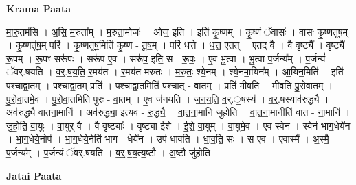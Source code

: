 \documentclass[17pt]{extarticle}
\begin{document}
\textbf{Krama Paata} \newline

मा॒रु॒तम॑सि । अ॒सि॒ म॒रुता᳚म् । म॒रुता॒मोजः॑ । ओज॒ इति॑ । इति॑ कृ॒ष्णम् । कृ॒ष्णं ॅवासः॑ । वासः॑ कृ॒ष्णतू॑षम् । कृ॒ष्णतू॑ष॒म् परि॑ । कृ॒ष्णतू॑ष॒मिति॑ कृ॒ष्ण - तू॒ष॒म् । परि॑ धत्ते । ध॒त्त॒ ए॒तत् । ए॒तद् वै । वै वृष्ट्यै᳚ । वृष्ट्यै॑ रू॒पम् । रू॒पꣳ सरू॑पः । सरू॑प ए॒व । सरू॑प॒ इति॒ स - रू॒पः॒ । ए॒व भू॒त्वा । भू॒त्वा प॒र्जन्य᳚म् । प॒र्जन्यं॑ ॅवर्.षयति । व॒र्॒.ष॒य॒ति॒ र॒मय॑त । र॒मय॑त मरुतः । म॒रु॒तः॒ श्ये॒नम् । श्ये॒नमा॒यिन᳚म् । आ॒यिन॒मिति॑ । इति॑ पश्चाद्वा॒तम् । प॒श्चा॒द्वा॒तम् प्रति॑ । प॒श्चा॒द्वा॒तमिति॑ पश्चात् - वा॒तम् । प्रति॑ मीवति । मी॒व॒ति॒ पु॒रो॒वा॒तम् । पु॒रो॒वा॒तमे॒व । पु॒रो॒वा॒तमिति॑ पुरः - वा॒तम् । ए॒व ज॑नयति । ज॒न॒य॒ति॒ व॒र्.॒षस्य॑ । व॒र्॒.षस्याव॑रुद्ध्यै । अव॑रुद्ध्यै वातना॒मानि॑ । अव॑रुद्ध्या॒ इत्यव॑ - रु॒द्ध्यै॒ । वा॒त॒ना॒मानि॑ जुहोति । वा॒त॒ना॒मानीति॑ वात - ना॒मानि॑ । जु॒हो॒ति॒ वा॒युः । वा॒युर् वै । वै वृष्ट्याः᳚ । वृष्ट्या॑ ईशे । ई॒शे॒ वा॒युम् । वा॒युमे॒व । ए॒व स्वेन॑ । स्वेन॑ भाग॒धेये॑न । भा॒ग॒धेये॒नोप॑ । भा॒ग॒धेये॒नेति॑ भाग - धेये॑न । उप॑ धावति । धा॒व॒ति॒ सः । स ए॒व । ए॒वास्मै᳚ । अ॒स्मै॒ प॒र्जन्य᳚म् । प॒र्जन्यं॑ ॅवर्.षयति । व॒र्॒.ष॒य॒त्य॒ष्टौ । अ॒ष्टौ जु॑होति \newline

\textbf{Jatai Paata} \newline
\end{document}
